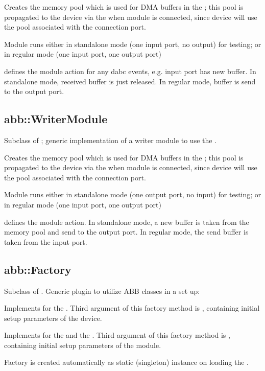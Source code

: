 \begin{compactenum} 
\item Creates the memory pool which is used for DMA buffers in the ; this pool is propagated to the device via the  when module is connected, since device will use the pool associated with the connection port.
\item Module runs either in standalone mode (one input port, no output) for testing; or in regular mode (one input port, one output port)
\item {} defines the module action for any dabc events, e.g. input port has new buffer. In standalone mode, received buffer is just released. In regular mode, buffer is send to the output port.
\end{compactenum} 

\subsection{abb::WriterModule}
Subclass of ; generic implementation of a writer module to use the .
\begin{compactenum} 

\item Creates the memory pool which is used for DMA buffers in the ; this pool is propagated to the device via the  when module is connected, since device will use the pool associated with the connection port.
\item Module runs either in standalone mode (one output port, no input) for testing; or in regular mode (one input port, one output port)
\item {} defines the module action. In standalone mode, a new buffer is taken from the memory pool and send to the output port. In regular mode, the send buffer is taken from the input port.

\end{compactenum} 

\subsection{abb::Factory}
Subclass of . Generic plugin to utilize ABB classes in a set up:
\begin{compactenum} 

\item Implements  for the . Third argument of this factory method is , containing initial setup parameters of the device.
\item Implements  for the  and the . Third argument of this factory method is , containing initial setup parameters of the module.
\item Factory is created automatically as static (singleton) instance on loading the .

\end{compactenum} 


